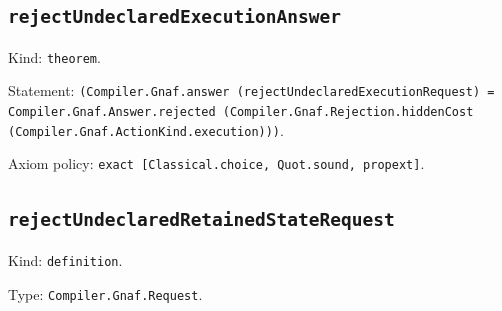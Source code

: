 \documentclass[11pt]{article}
\begin{document}
\subsection*{\texttt{rejectUndeclaredExecutionAnswer}}
\noindent Kind: \texttt{theorem}.\par
\noindent Statement: \texttt{(Compiler.Gnaf.answer (rejectUndeclaredExecutionRequest) = Compiler.Gnaf.Answer.rejected (Compiler.Gnaf.Rejection.hiddenCost (Compiler.Gnaf.ActionKind.execution)))}.\par
\noindent Axiom policy: \texttt{exact [Classical.choice, Quot.sound, propext]}.\par
\subsection*{\texttt{rejectUndeclaredRetainedStateRequest}}
\noindent Kind: \texttt{definition}.\par
\noindent Type: \texttt{Compiler.Gnaf.Request}.\par
\end{document}
